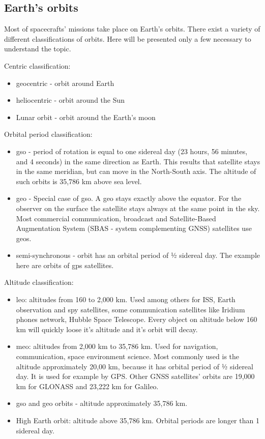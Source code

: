 \documentclass[12pt,a4paper,twoside]{article}
\begin{document}
\subsection{Earth's orbits}

Most of spacecrafts' missions take place on Earth's orbits. There exist a variety of different classifications of orbits. Here will be presented only a few necessary to understand the topic.

Centric classification:

\begin{itemize}
\item geocentric - orbit around Earth
\item heliocentric - orbit around the Sun
\item Lunar orbit - orbit around the Earth's moon
\end{itemize}

Orbital period classification:

\begin{itemize}
\item \gls{gso} - period of rotation is equal to one sidereal day (23 hours, 56 minutes, and 4 seconds) in the same direction as Earth. This results that satellite stays in the same meridian, but can move in the North-South axis. The altitude of such orbits is 35,786 km above sea level.
\item \gls{geo} - Special case of \gls{gso}. A \gls{geo} stays exactly above the equator. For the observer on the surface the satellite stays always at the same point in the sky. Most commercial communication, broadcast and Satellite-Based Augmentation System (SBAS - system complementing GNSS) satellites use \gls{geo}s.
\item semi-synchronous - orbit has an orbital period of ½ sidereal day. The example here are orbits of \gls{gps} satellites.
\end{itemize}
\pagebreak
Altitude classification: 

\begin{itemize}
\item \gls{leo}: altitudes from 160 to 2,000 km. Used among others for ISS, Earth observation and spy satellites, some communication satellites like Iridium phones network, Hubble Space Telescope. Every object on altitude below 160 km will quickly loose it's altitude and it's orbit will decay.
\item \gls{meo}: altitudes from 2,000 km to 35,786 km. Used for navigation, communication, space environment science. Most commonly used is the altitude approximately 20,00 km, because it has orbital period of ½ sidereal day. It is used for example by GPS. Other GNSS satellites' orbits are 19,000 km for GLONASS and 23,222 km for Galileo.
\item \gls{gso} and \gls{geo} orbits - altitude approximately 35,786 km.
\item High Earth orbit: altitude above 35,786 km. Orbital periods are longer than 1 sidereal day.

\end{itemize}
\end{document}
